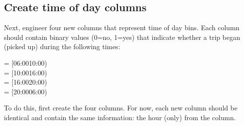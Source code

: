\documentclass[letterpaper,10pt,english]{sphinxmanual}
\begin{document}
\subsection{Create time of day columns}
\label{\detokenize{Automatidata_Machine Learning:create-time-of-day-columns}}
\sphinxAtStartPar
Next, engineer four new columns that represent time of day bins. Each column should contain binary values (0=no, 1=yes) that indicate whether a trip began (picked up) during the following times:

\sphinxAtStartPar
{} = {[}06:00\textendash{}10:00)\\
 = {[}10:00\textendash{}16:00)\\
 = {[}16:00\textendash{}20:00)\\
 = {[}20:00\textendash{}06:00)

\sphinxAtStartPar
To do this, first create the four columns. For now, each new column should be identical and contain the same information: the hour (only) from the  column.
\end{document}
